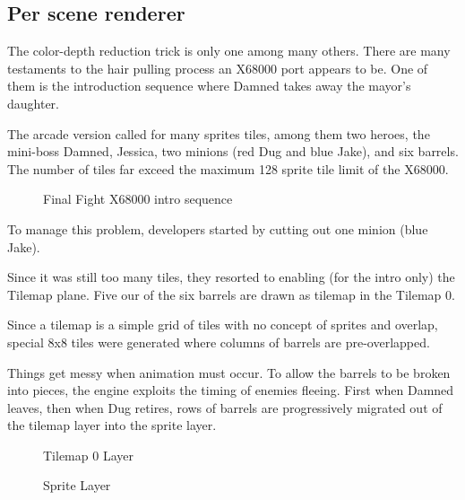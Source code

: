 \pagebreak

\subsection{Per scene renderer}

The color-depth reduction trick is only one among many others. There are many testaments to the hair pulling process an X68000 port appears to be. One of them is the introduction sequence where Damned takes away the mayor's daughter.

The arcade version called for many sprites tiles, among them two heroes, the mini-boss Damned, Jessica, two minions (red Dug and blue Jake), and six barrels. The number of tiles far exceed the maximum 128 sprite tile limit of the X68000.

\begin{figure}[H]
\caption*{Final Fight X68000 intro sequence}
\end{figure}

To manage this problem, developers started by cutting out one minion (blue Jake). 

Since it was still too many tiles, they resorted to enabling (for the intro only) the Tilemap plane. Five our of the six barrels are drawn as tilemap in the Tilemap 0.

Since a tilemap is a simple grid of tiles with no concept of sprites and overlap, special 8x8 tiles were generated where columns of barrels are pre-overlapped.

Things get messy when animation must occur. To allow the barrels to be broken into pieces, the engine exploits the timing of enemies fleeing. First when Damned leaves, then when Dug retires, rows of barrels are progressively migrated out of the tilemap layer into the sprite layer. 



\begin{minipage}[!t]{0.49\linewidth}
\vspace{-3mm}
  \begin{figure}[H]
  \caption*{Tilemap 0 Layer}
  \end{figure}
\end{minipage}%
\hfill
\begin{minipage}[!t]{0.49\linewidth}
\vspace{-3mm}
   \begin{figure}[H]
  \caption*{Sprite Layer}
  \end{figure}
\end{minipage}

